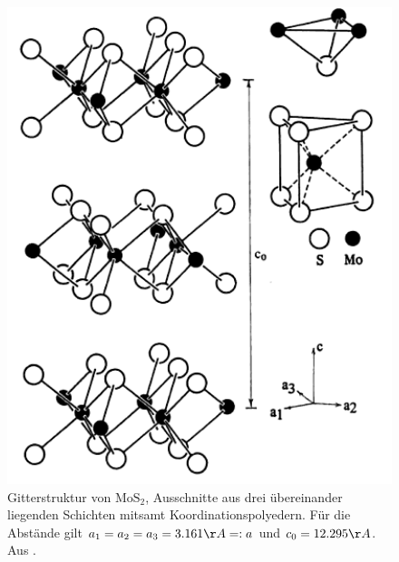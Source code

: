 \begin{figure}
    \includegraphics[width=1.0\textwidth]{pics/MoS2_structure}
    \caption{Gitterstruktur von $\mathrm{MoS_2}$, Ausschnitte aus drei übereinander 
liegenden Schichten mitsamt Koordinationspolyedern. Für die Abstände gilt 
$a_1 = a_2 = a_3 = 3.161\AA =: a$ und $c_0 = 12.295\AA$. 
Aus \cite{schrocke1981mineralogie}.}
    \label{fig:MoS2_structure}
\end{figure} 

